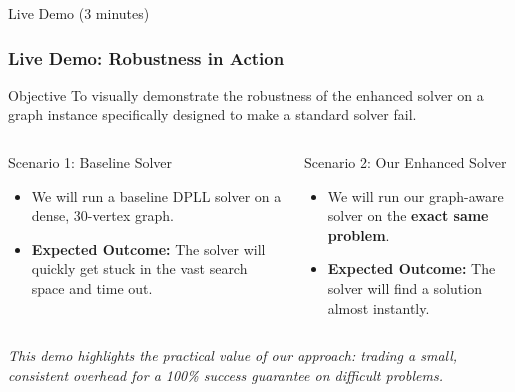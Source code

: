 \documentclass[11pt]{beamer}
\begin{document}
\begin{frame}{Live Demo (3 minutes)}
	\frametitle{Live Demo: Robustness in Action}
	\begin{block}{Objective}
		To visually demonstrate the robustness of the enhanced solver on a graph instance specifically designed to make a standard solver fail.
	\end{block}
	
	\begin{columns}[T]
		\begin{column}{0.5\textwidth}
			\begin{alertblock}{Scenario 1: Baseline Solver}
				\begin{itemize}
					\item We will run a baseline DPLL solver on a dense, 30-vertex graph.
					\item \textbf{Expected Outcome:} The solver will quickly get stuck in the vast search space and time out.
				\end{itemize}
			\end{alertblock}
		\end{column}
		\begin{column}{0.5\textwidth}
			\begin{block}{Scenario 2: Our Enhanced Solver}
				\begin{itemize}
					\item We will run our graph-aware solver on the \textbf{exact same problem}.
					\item \textbf{Expected Outcome:} The solver will find a solution almost instantly.
				\end{itemize}
			\end{block}
		\end{column}
	\end{columns}
	\vfill
	\begin{center}
		\textit{This demo highlights the practical value of our approach: trading a small, consistent overhead for a 100\% success guarantee on difficult problems.}
	\end{center}
\end{frame}
\end{document}
